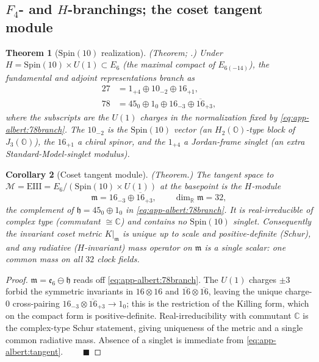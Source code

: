 \documentclass[11pt]{article}
\theoremstyle{plain}
\newtheorem{theorem}{Theorem}[section]
\newtheorem{corollary}[theorem]{Corollary}
\theoremstyle{definition}
\theoremstyle{remark}
\begin{document}
\subsection{$F_4$- and $H$-branchings; the coset tangent module}
\label{sec:app-albert:branch}

\begin{theorem}[$\mathrm{Spin}(10)$ realization]\label{thm:app-albert:F4E6}
\textup{(Theorem; \cite{Baez:2002,Springer:2000}.)}
Under $H=\mathrm{Spin}(10)\times U(1)\subset E_6$ (the maximal compact of
$E_{6(-14)}$), the fundamental and adjoint representations branch as
\begin{align}
  27 &= 1_{+4}\oplus 10_{-2}\oplus 16_{+1},
  \label{eq:app-albert:27branch}\\
  78 &= 45_{0}\oplus 1_{0}\oplus 16_{-3}\oplus \overline{16}_{+3},
  \label{eq:app-albert:78branch}
\end{align}
where the subscripts are the $U(1)$ charges in the normalization fixed by
\eqref{eq:app-albert:78branch}. The $10_{-2}$ is the $\mathrm{Spin}(10)$ vector
(an $H_2(\mathbb O)$-type block of $J_3(\mathbb O)$), the $16_{+1}$ a chiral
spinor, and the $1_{+4}$ a Jordan-frame singlet (an extra Standard-Model-singlet
modulus).
\end{theorem}

\begin{corollary}[Coset tangent module]\label{cor:app-albert:tangent}
\textup{(Theorem.)}
The tangent space to $\mathcal M=\mathrm{EIII}=E_6/(\mathrm{Spin}(10)\times U(1))$
at the basepoint is the $H$-module
\begin{equation}\label{eq:app-albert:tangent}
  \mathfrak m=16_{-3}\oplus\overline{16}_{+3},
  \qquad \dim_{\mathbb R}\mathfrak m=32,
\end{equation}
the complement of $\mathfrak h=45_0\oplus1_0$ in
\eqref{eq:app-albert:78branch}. It is \emph{real-irreducible of complex type}
(commutant $\cong\mathbb C$) and contains \emph{no} $\mathrm{Spin}(10)$ singlet.
Consequently the invariant coset metric $K|_{\mathfrak m}$ is unique up to scale
and \emph{positive-definite} (Schur), and any radiative ($H$-invariant)
mass operator on $\mathfrak m$ is a single scalar: one common mass on all $32$
clock fields.
\end{corollary}

\begin{proof}
$\mathfrak m=\mathfrak e_6\ominus\mathfrak h$ reads off
\eqref{eq:app-albert:78branch}. The $U(1)$ charges $\pm3$ forbid the symmetric
invariants in $16\otimes16$ and $\overline{16}\otimes\overline{16}$, leaving the
unique charge-$0$ cross-pairing $16_{-3}\otimes\overline{16}_{+3}\to1_0$; this is
the restriction of the Killing form, which on the compact form is
positive-definite. Real-irreducibility with commutant $\mathbb C$ is the
complex-type Schur statement, giving uniqueness of the metric and a single common
radiative mass. Absence of a singlet is immediate from
\eqref{eq:app-albert:tangent}. $\qquad\blacksquare$
\end{proof}
\end{document}
